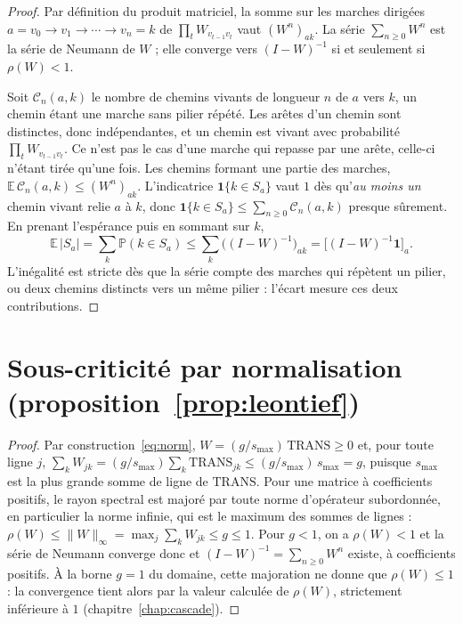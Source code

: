 \begin{proof}
Par définition du produit matriciel, la somme sur les marches dirigées
$a=v_0\to v_1\to\cdots\to v_n=k$ de $\prod_t W_{v_{t-1}v_t}$ vaut $(W^n)_{ak}$. La série
$\sum_{n\ge0}W^n$ est la série de Neumann de $W$ ; elle converge vers $(I-W)^{-1}$ si et seulement si
$\rho(W)<1$.

Soit $\mathcal C_n(a,k)$ le nombre de chemins vivants de longueur $n$ de $a$ vers $k$, un chemin
étant une marche sans pilier répété. Les arêtes d'un chemin sont distinctes, donc indépendantes, et
un chemin est vivant avec probabilité $\prod_t W_{v_{t-1}v_t}$. Ce n'est pas le cas d'une marche qui
repasse par une arête, celle-ci n'étant tirée qu'une fois. Les chemins formant une partie des
marches, $\mathbb E\,\mathcal C_n(a,k)\le (W^n)_{ak}$. L'indicatrice $\mathbf 1\{k\in S_a\}$ vaut $1$
dès qu'\emph{au moins un} chemin vivant relie $a$ à $k$, donc
$\mathbf 1\{k\in S_a\}\le \sum_{n\ge0}\mathcal C_n(a,k)$ presque sûrement. En prenant l'espérance
puis en sommant sur $k$,
\[
  \mathbb E\,|S_a|=\sum_k \mathbb P(k\in S_a)\le \sum_k\bigl((I-W)^{-1}\bigr)_{ak}
  =\bigl[(I-W)^{-1}\mathbf 1\bigr]_a .
\]
L'inégalité est stricte dès que la série compte des marches qui répètent un pilier, ou deux
chemins distincts vers un même pilier : l'écart mesure ces deux contributions.
\end{proof}

\section*{Sous-criticité par normalisation (proposition~\ref{prop:leontief})}

\begin{proof}
Par construction~\eqref{eq:norm}, $W=(g/s_{\max})\,\mathrm{TRANS}\ge 0$ et, pour toute ligne
$j$, $\sum_k W_{jk}=(g/s_{\max})\sum_k \mathrm{TRANS}_{jk}\le (g/s_{\max})\,s_{\max}=g$, puisque
$s_{\max}$ est la plus grande somme de ligne de $\mathrm{TRANS}$. Pour une matrice à
coefficients positifs, le rayon spectral est majoré par toute norme d'opérateur subordonnée,
en particulier la norme infinie, qui est le maximum des sommes de lignes :
$\rho(W)\le\lVert W\rVert_\infty=\max_j\sum_k W_{jk}\le g\le 1$. Pour $g<1$, on a $\rho(W)<1$ et la
série de Neumann converge donc
et $(I-W)^{-1}=\sum_{n\ge0}W^n$ existe, à coefficients positifs. À la borne $g=1$ du domaine, cette
majoration ne donne que $\rho(W)\le 1$ : la convergence tient alors par la valeur calculée de
$\rho(W)$, strictement inférieure à $1$ (chapitre~\ref{chap:cascade}).
\end{proof}

